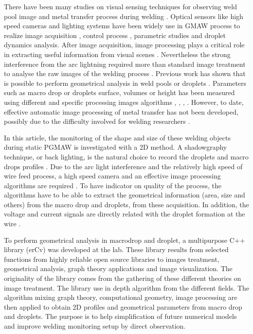\documentclass[12pt]{iopart}
\begin{document}
There have been many studies on visual sensing techniques for observing weld pool 
image \cite{BAE} and metal transfer process during welding \cite{LIN}.
Optical sensors like high speed  cameras and lighting systems have been
widely use in GMAW process to realize  image acquisition \cite{ZHANG4},
control process \cite{BAE}, parametric studies \cite{BALSAMO} and droplet dynamics analysis\cite{LIN}.
After image acquisition, image processing plays a critical role in extracting useful 
information from visual scenes \cite{WANG}.
Nevertheless the strong interference from the arc lightning required more than standard 
image treatment to analyse the raw images of the welding process \cite{NORDBRUCH}. 
Previous work has shown that is possible to perform geometrical 
analysis in weld pools or droplets \cite{WU1}.
Parameters such as macro drop or droplets surface, volumes 
or height has been measured using different and 
specific processing images algorithms \cite{WANG}, \cite{WU1}, \cite{SAEED},
\cite{NORDBRUCH}. However, to date, effective automatic image processing
of metal transfer has not been developed, possibly due to the  difficulty involved 
for welding researchers \cite{WANG}. 

In this article, the monitoring of the shape and size of these welding objects during
static PGMAW  is 
investigated with a 2D method. A shadowgraphy technique, or back lighting,
is the natural choice to record the droplets and macro drops profiles \cite{BALSAMO}.
 Due to the arc light interference and the relatively high 
speed of wire feed process, a high speed camera and an effective image processing algorithms are 
required \cite{WANG}.  To have indicator on quality of the process,  the algorithms have to be able to extract 
the geometrical information (area, size and others) from the macro drop and droplets,
from these acquisition. In addition, the voltage and current signals are directly related 
with the droplet formation at the wire \cite{BALSAMO}.

To perform geometrical analysis in macrodrop and droplet,
 a multipurpose C++  library (erCv) was developed at the lab. 
These library results from selected functions  from highly reliable 
open source libraries to images treatment, geometrical 
analysis, graph theory applications and image visualization.
The originality of the library comes from the gathering of these different
theories on image treatment. The library use in depth algorithm from the different fields.
The algorithm mixing graph theory, computational geometry, image processing are then applied to obtain 
 2D profiles and geometrical
parameters from macro drop and droplets.
The purpose is to help simplification of future numerical models 
and improve welding monitoring setup by direct observation.
     
\end{document}
